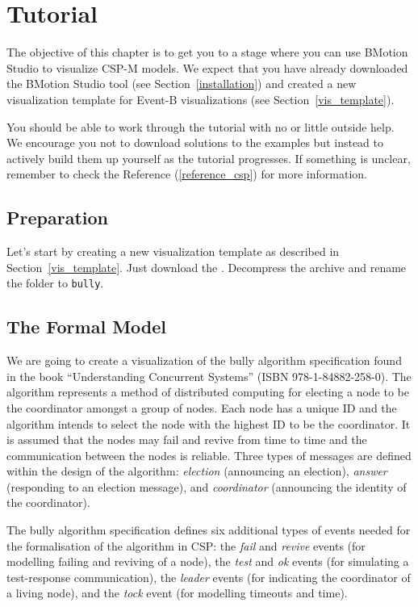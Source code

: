\section{Tutorial}
\label{tutorial_csp}

The objective of this chapter is to get you to a stage where you can use BMotion Studio to visualize CSP-M models. 
We expect that you have already downloaded the BMotion Studio tool (see Section~\ref{installation}) and created a new visualization template for Event-B visualizations (see Section~\ref{vis_template}).
 
You should be able to work through the tutorial with no or little outside help.
We encourage you not to download solutions to the examples but instead to actively build them up yourself as the tutorial progresses.
If something is unclear, remember to check the Reference (\ref{reference_csp}) for more information.

\subsection{Preparation}

Let's start by creating a new visualization template as described in Section~\ref{vis_template}.
Just download the .
Decompress the archive and rename the folder to \texttt{bully}.

\subsection{The Formal Model}

We are going to create a visualization of the bully algorithm specification found in the book ``Understanding Concurrent Systems'' (ISBN 978-1-84882-258-0).
The algorithm represents a method of distributed computing for electing a node to be the coordinator amongst a group of nodes.
Each node has a unique ID and the algorithm intends to select the node with the highest ID to be the coordinator.
It is assumed that the nodes may fail and revive from time to time and the communication between the nodes is reliable.
Three types of messages are defined within the design of the algorithm: \textit{election} (announcing an election), \textit{answer} (responding to an election message), and \textit{coordinator} (announcing the identity of the coordinator).

The bully algorithm specification defines six additional types of events needed for the formalisation of the algorithm in CSP:
the \textit{fail} and \textit{revive} events (for modelling failing and reviving of a node), the \textit{test} and \textit{ok} events (for simulating a test-response communication), the \textit{leader} events (for indicating the coordinator of a living node), and the \textit{tock} event (for modelling timeouts and time).

